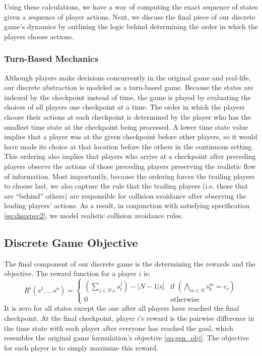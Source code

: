 Using these calculations, we have a way of computing the exact sequence of states given a sequence of player actions. Next, we discuss the final piece of our discrete game's dynamics by outlining the logic behind determining the order in which the players choose actions. 

\subsubsection{Turn-Based Mechanics}
Although players make decisions concurrently in the original game and real-life, our discrete abstraction is modeled as a turn-based game. Because the states are indexed by the checkpoint instead of time, the game is played by evaluating the choices of all players one checkpoint at a time. The order in which the players choose their actions at each checkpoint is determined by the player who has the smallest time state at the checkpoint being processed. A lower time state value implies that a player was at the given checkpoint before other players, so it would have made its choice at that location before the others in the continuous setting. This ordering also implies that players who arrive at a checkpoint after preceding players observe the actions of those preceding players preserving the realistic flow of information. Most importantly, because the ordering forces the trailing players to choose last, we also capture the rule that the trailing players (i.e. those that are ``behind'' others) are responsible for collision avoidance after observing the leading players' actions. As a result, in conjunction with satisfying specification \eqref{eq:discspec2}, we model realistic collision avoidance rules. 

\subsection{Discrete Game Objective} \label{section:discobj}
The final component of our discrete game is the determining the rewards and the objective. The reward function for a player $i$ is: 
\begin{equation}
    R^i(s^1, ... s^n) = \begin{cases} 
                (\sum_{j \in N \setminus i} s^j_t) - |N-1|s^i_t & \text{if } (\bigwedge_{m \in N} s^m_k   = c_\tau) \\ 
                0    & \text{otherwise}
                \end{cases}
\end{equation}
It is zero for all states except the one after all players have reached the final checkpoint. At the final checkpoint, player $i$'s reward is the pairwise difference in the time state with each player after everyone has reached the goal, which resembles the original game formulation's objective \eqref{eq:gen_obj}. The objective for each player is to simply maximize this reward.

